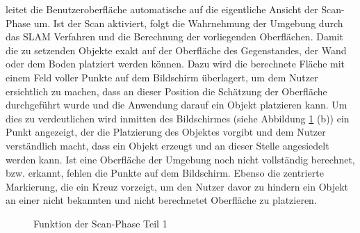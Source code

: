 leitet die Benutzeroberfläche automatische auf die eigentliche Ansicht der Scan-Phase um. Ist der Scan aktiviert, folgt die Wahrnehmung der Umgebung durch das 
\acs{SLAM} Verfahren und die Berechnung der vorliegenden Oberflächen. Damit die zu setzenden Objekte exakt auf der Oberfläche des Gegenstandes, der Wand oder dem 
Boden platziert werden können. Dazu wird die berechnete Fläche mit einem Feld voller Punkte auf dem Bildschirm überlagert, um dem Nutzer ersichtlich zu machen, 
dass an dieser Position die Schätzung der Oberfläche durchgeführt wurde und die Anwendung darauf ein Objekt platzieren kann. Um dies zu verdeutlichen wird inmitten 
des Bildschirmes (siehe Abbildung \ref{pic:markerTracking} (b)) ein Punkt angezeigt, der die Platzierung des Objektes vorgibt und dem Nutzer verständlich macht, 
dass ein Objekt erzeugt und an dieser Stelle angesiedelt werden kann. Ist eine Oberfläche der Umgebung noch nicht vollständig berechnet, bzw. erkannt, fehlen 
die Punkte auf dem Bildschirm. Ebenso die zentrierte Markierung, die ein Kreuz vorzeigt, um den Nutzer davor zu hindern ein Objekt an einer nicht bekannten und 
nicht berechnetet Oberfläche zu platzieren.
\begin{figure}[hbt!]
    \centering
    \caption{Funktion der Scan-Phase Teil 1}
    \label{pic:markerTracking}
\end{figure}
